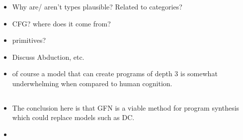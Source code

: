 \subsubsection{}
\begin{itemize}
    \item Why are/ aren't types plausible? Related to categories?
    \item CFG? where does it come from?
    \item primitives?
    \item Discuss Abduction, etc. 
    \item of course a model that can create programs of depth 3 is somewhat underwhelming when compared to human cognition. 
\end{itemize}









































\subsection{}
\begin{itemize}
    \item The conclusion here is that GFN is a viable method for program synthesis which could replace models such as DC. 
    \item 
\end{itemize}






























